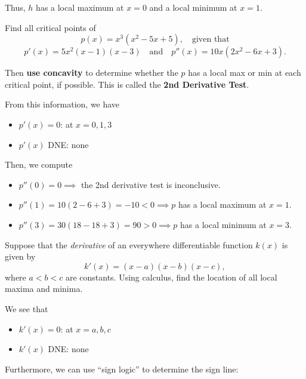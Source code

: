\documentclass[11pt]{exam}
\begin{document}
\begin{questions}
\begin{solution}
Thus, \(h\) has a local maximum at \(x=0\) and a local minimum at \(x=1\).
\end{solution}
\question Find all critical points of $$p(x) = x^3(x^2-5x+5), \quad \textrm{given that}$$ $$p'(x) =5x^2(x-1)(x-3) \quad \textrm{and} \quad p''(x) = 10x(2x^2-6x+3).$$

Then \textbf{use concavity} to determine whether the $p$ has a local max or min at each critical point, if possible.  This is called the \textbf{2nd Derivative Test}.
\begin{solution}
  From this information, we have
  \begin{itemize}
  \item \(p'(x) = 0\): at \(x=0,1,3\)
  \item \(p'(x)\) DNE: none
  \end{itemize}
  Then, we compute
  \begin{itemize}
  \item \(p''(0) = 0 \implies\) the 2nd derivative test is inconclusive.
  \item \(p''(1) = 10(2-6+3) = -10 < 0 \implies p\) has a local
    maximum at \(x=1\).
  \item \(p''(3) = 30(18-18+3) = 90 > 0 \implies p\) has a local
    minimum at \(x=3\).
  \end{itemize}
\end{solution}
\question Suppose that the \textit{derivative} of an everywhere differentiable function $k(x)$ is given by $$k'(x) = (x-a)(x-b)(x-c),$$ where $a<b<c$ are constants.  Using calculus, find the location of all local maxima and minima.
  \begin{solution}
    We see that
    \begin{itemize}
    \item \(k'(x) = 0\): at \(x=a,b,c\)
    \item \(k'(x)\) DNE: none
    \end{itemize}
    Furthermore, we can use ``sign logic'' to determine the sign line:



\end{solution}
\end{questions}
\end{document}
